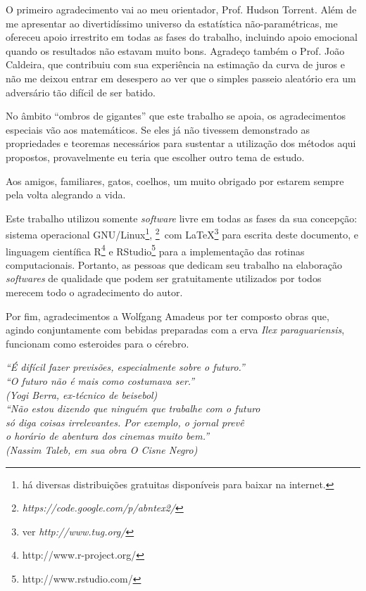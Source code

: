 \documentclass[
	12pt,				%
	openright,			%
	oneside,			%
	a4paper,			%
	english,			%
	brazil				%
	]{dissertacao-ufrgs-abntex2}
\begin{document}
\begin{agradecimentos}

O primeiro agradecimento vai ao meu orientador, Prof. Hudson Torrent. 
Além de me apresentar ao divertidíssimo universo da estatística não-paramétricas, me ofereceu apoio irrestrito em todas as fases do trabalho, incluindo apoio emocional quando os resultados não estavam muito bons. Agradeço também o Prof. João Caldeira, que contribuiu com sua experiência na estimação da curva de juros e não me deixou entrar em desespero ao ver que o simples passeio aleatório era um adversário tão difícil de ser batido.

No âmbito ``ombros de gigantes'' que este trabalho se apoia, os agradecimentos especiais vão aos matemáticos. Se eles já não tivessem demonstrado as propriedades e teoremas necessários para sustentar a utilização dos métodos aqui propostos, provavelmente eu teria que escolher outro tema de estudo.

Aos amigos, familiares, gatos, coelhos, um muito obrigado por estarem sempre pela volta alegrando a vida.

Este trabalho utilizou somente \emph{software} livre em todas as fases da sua concepção: sistema operacional GNU/Linux\footnote{há diversas distribuições gratuitas disponíveis para baixar na internet. }, \abnTeX \footnote{\emph{https://code.google.com/p/abntex2/}}~com \LaTeX \footnote{ver \emph{http://www.tug.org/}} para escrita deste documento, e linguagem científica R\footnote{http://www.r-project.org/} e RStudio\footnote{http://www.rstudio.com/} para a implementação das rotinas computacionais.
Portanto, as pessoas que dedicam seu trabalho na elaboração \emph{softwares} de qualidade que podem ser gratuitamente utilizados por todos merecem todo o agradecimento do autor.

Por fim, agradecimentos a Wolfgang Amadeus por ter composto obras que, agindo conjuntamente com bebidas preparadas com a erva \emph{Ilex paraguariensis}, funcionam como esteroides para o cérebro.



\end{agradecimentos}

\begin{epigrafe}
    \vspace*{\fill}
	\begin{flushright}
		\textit{
		``É difícil fazer previsões, especialmente sobre o futuro.''\\
		``O futuro não é mais como costumava ser.'' \\
		(Yogi Berra, ex-técnico de beisebol)\\ [1cm]
		``Não estou dizendo que ninguém que trabalhe com o futuro\\
		só diga coisas irrelevantes. Por exemplo, o jornal prevê \\
		o horário de abentura dos cinemas muito bem.'' \\		
		(Nassim Taleb, em sua obra \emph{O Cisne Negro})
		}
	\end{flushright}
\end{epigrafe}
\end{document}
